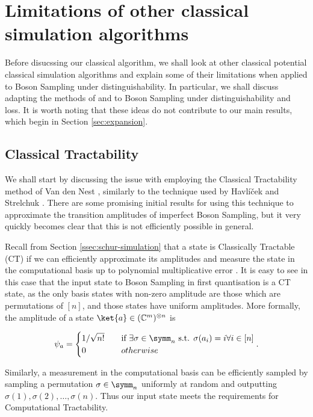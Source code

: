 \section{Limitations of other classical simulation algorithms}
\label{sec:what-didnt-work}

Before disucssing our classical algorithm, we shall look at other classical potential classical simulation algorithms and explain some of their limitations when applied to Boson Sampling under distinguishability. In particular, we shall discuss adapting the methods of \cite{havlicek2018, havlicek2019} and \cite{oszmaniec2018} to Boson Sampling under distinguishability and loss. It is worth noting that these ideas do not contribute to our main results, which begin in Section \ref{sec:expansion}.

\subsection{Classical Tractability}

We shall start by discussing the issue with employing the Classical Tractability method of Van den Nest \cite{vandennest2011}, similarly to the technique used by Havl\'{i}\v{c}ek and Strelchuk \cite{havlicek2018}. There are some promising initial results for using this technique to approximate the transition amplitudes of imperfect Boson Sampling, but it very quickly becomes clear that this is not efficiently possible in general.

Recall from Section \ref{ssec:schur-simulation} that a state is Classically Tractable (CT) if we can efficiently approximate its amplitudes and measure the state in the computational basis up to polynomial multiplicative error \cite{vandennest2011}. It is easy to see in this case that the input state to Boson Sampling in first quantisation is a CT state, as the only basis states with non-zero amplitude are those which are permutations of $[n]$, and those states have uniform amplitudes. More formally, the amplitude of a state $\ket{a}\in(\mathbb{C}^m)^{\otimes n}$ is

\begin{equation}
\psi_a = \begin{cases}1/\sqrt{n!} & \quad \textrm{if } \exists \sigma\in\symm_n \textrm{ s.t. } \sigma(a_i) = i \forall i\in[n]\\0 & \quad{otherwise}\end{cases}.
\end{equation}

Similarly, a measurement in the computational basis can be efficiently sampled by sampling a permutation $\sigma \in \symm_n$ uniformly at random and outputting $\sigma(1), \sigma(2),\dots,\sigma(n)$. Thus our input state meets the requirements for Computational Tractability.

